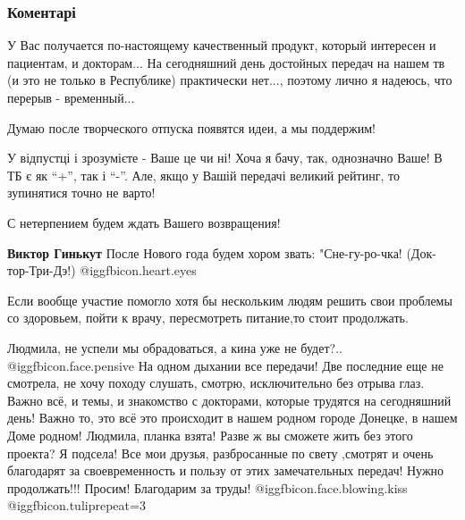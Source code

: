  
 
 
 
 
\subsubsection{Коментарі}

\begin{itemize} %

У Вас получается по-настоящему качественный продукт, который интересен и
пациентам, и докторам... На сегодняшний день достойных передач на нашем тв (и
это не только в Республике) практически нет..., поэтому лично я надеюсь, что
перерыв - временный...

Думаю после творческого отпуска появятся идеи, а мы поддержим!


У відпустці і зрозумієте - Ваше це чи ні! Хоча я бачу, так, однозначно Ваше! В
ТБ є як \enquote{+}, так і \enquote{-}. Але, якщо у Вашій передачі великий рейтинг, то
зупинятися точно не варто!

С нетерпением будем ждать Вашего возвращения!

\begin{itemize} %
\textbf{Виктор Гинькут} После Нового года будем хором звать: "Сне-гу-ро-чка! (Док-тор-Три-Дэ!)  @igg{fbicon.heart.eyes} 
\end{itemize} %

Если вообще участие помогло хотя бы нескольким людям решить свои проблемы со здоровьем, пойти к врачу, пересмотреть питание,то стоит продолжать.


Людмила, не успели мы обрадоваться, а кина уже не будет?..  @igg{fbicon.face.pensive}  На одном дыхании
все передачи! Две последние еще не смотрела, не хочу походу слушать, смотрю,
исключительно без отрыва глаз. Важно всё, и темы, и знакомство с докторами,
которые трудятся на сегодняшний день! Важно то, это всё это происходит в нашем
родном городе Донецке, в нашем Доме родном! Людмила, планка взята! Разве ж вы
сможете жить без этого проекта? Я подсела! Все мои друзья, разбросанные по
свету ,смотрят и очень благодарят за своевременность и пользу от этих
замечательных передач! Нужно продолжать!!! Просим! Благодарим за труды!
 @igg{fbicon.face.blowing.kiss}  @igg{fbicon.tulip}{repeat=3} 


\end{itemize}
